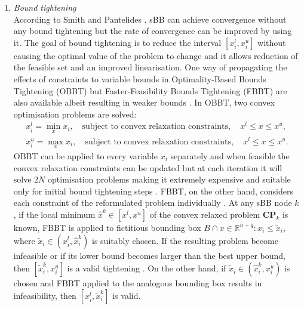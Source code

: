 \begin{enumerate}
	\item \emph{Bound tightening}\\
	According to Smith and Pantelides \cite{Smith:1999aa}, sBB can  achieve convergence without any bound tightening but the rate of convergence can be improved by using it. The goal of bound tightening is to reduce the interval $[x_i^l, x_i^u]$ without causing the optimal value of the problem to change and it allows reduction of the feasible set and an improved linearisation. One way of propagating the effects of constraints to variable bounds in Optimality-Based Bounds Tightening (OBBT) \cite{Liberti:2006aa,Quesada:1995aa,Smith:1996aa} but Faster-Feasibility Bounds Tightening (FBBT) are also available albeit resulting in weaker bounds \cite{Liberti:2006aa,Smith:1996aa,Shectman:1998aa,Sahinidis:2003aa}. In OBBT, two convex optimisation problems are solved:
	\begin{align}
		x_i^l = \min_x x_i, \quad \text{subject to convex relaxation constraints}, \quad x^l \leq x \leq x^u, \\
		x_i^u = \max_x x_i, \quad \text{subject to convex relaxation constraints}, \quad x^l \leq x \leq x^u.
	\end{align}
OBBT can be applied to every variable $x_i$ separately and when feasible the convex relaxation constraints can be updated but at each iteration it will solve $2N$ optimisation problems making it extremely expensive and suitable only for initial bound tightening steps \cite{Smith:1999aa}. FBBT, on the other hand, considers each constraint of the  reformulated problem individually \cite{Shectman:1998aa}. At any sBB node $k$, if the local minimum $\hat{x}^k \in \left[x^l, x^u\right]$ of the convex relaxed problem $\mathbf{CP}_k$ is known, FBBT is applied to fictitious bounding box $B \cap {x \in \mathbb{R}^{n+q} : x_i \leq \tilde{x}_i}$, where $\tilde{x}_i \in \left(x_i^l, \hat{x}_i^k\right)$ is suitably chosen. If the resulting problem become infeasible or if its lower bound becomes larger than the best upper bound, then $\left[\tilde{x}_i^k, x_i^u\right]$ is a valid tightening . On the other hand, if $\tilde{x}_i \in \left(\hat{x}_i^k, x_i^u\right)$ is chosen and FBBT applied to the analogous bounding box results in infeasibility, then $\left[x_i^l, \tilde{x}_i^k\right]$ is valid.
	

\end{enumerate}
